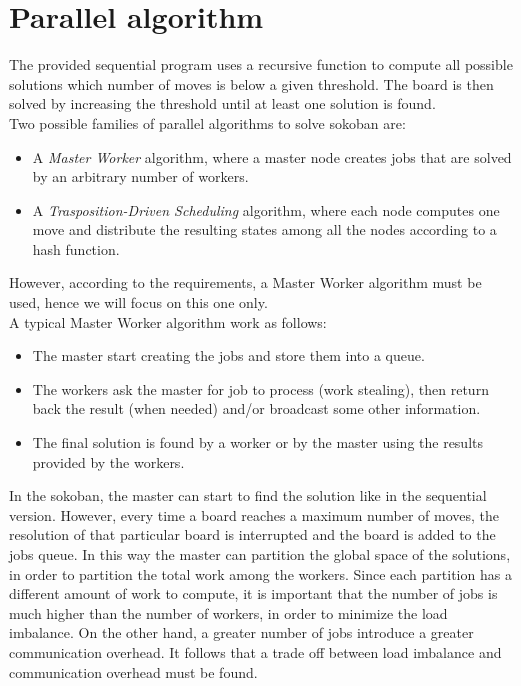 \documentclass{article}
\begin{document}
\section{Parallel algorithm}
The provided sequential program uses a recursive function to compute all possible solutions which number of moves is below a given threshold. The board is then solved by increasing the threshold until at least one solution is found. \\
Two possible families of parallel algorithms to solve sokoban are:
\begin{itemize}
    \item A \textit{Master Worker} algorithm, where a master node creates jobs that are solved by an arbitrary number of workers.
    \item A \textit{Trasposition-Driven Scheduling} algorithm, where each node computes one move and distribute the resulting states among all the nodes according to a hash function.
\end{itemize}
However, according to the requirements, a Master Worker algorithm must be used, hence we will focus on this one only. \\
A typical Master Worker algorithm work as follows:
\begin{itemize}
    \item The master start creating the jobs and store them into a queue.
    \item The workers ask the master for job to process (work stealing), then return back the result (when needed) and/or broadcast some other information.
    \item The final solution is found by a worker or by the master using the results provided by the workers.
\end{itemize}
In the sokoban, the master can start to find the solution like in the sequential version. However, every time a board reaches a maximum number of moves, the resolution of that particular board is interrupted and the board is added to the jobs queue. In this way the master can partition the global space of the solutions, in order to partition the total work among the workers. Since each partition has a different amount of work to compute, it is important that the number of jobs is much higher than the number of workers, in order to minimize the load imbalance. On the other hand, a greater number of jobs introduce a greater communication overhead. It follows that a trade off between load imbalance and communication overhead must be found. \\
\end{document}
